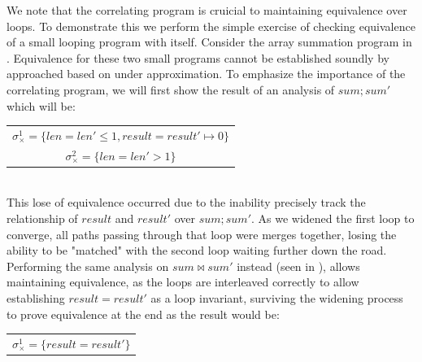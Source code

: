 We note that the correlating program is cruicial to maintaining equivalence over loops. To demonstrate this we perform the simple exercise of checking equivalence of a small looping program with itself. Consider the array summation program in . Equivalence for these two small programs cannot be established soundly by approached based on under approximation. To emphasize the importance of the correlating program, we will first show the result of an analysis of $sum;sum'$ which will be:
\\
\begin{tabular}{c}
\hspace{1cm} $\sigma_{\times}^1 = \{len = len' \leq 1, result = result' \mapsto 0\}$
\\
\hspace{1cm} $\sigma_{\times}^2 = \{len = len' > 1\}$
\end{tabular}
\\

This lose of equivalence occurred due to the inability precisely track the relationship of $result$ and $result'$ over $sum;sum'$. As we widened the first loop to converge, all paths passing through that loop were merges together, losing the ability to be "matched" with the second loop waiting further down the road. Performing the same analysis on $sum \bowtie sum'$ instead (seen in ), allows maintaining equivalence, as the loops are interleaved correctly to allow establishing $result = result'$ as a loop invariant, surviving the widening process to prove equivalence at the end as the result would be:
\\
\begin{tabular}{c}
\hspace{2cm} $\sigma_{\times}^1 = \{result = result'\}$
\end{tabular}
\\

